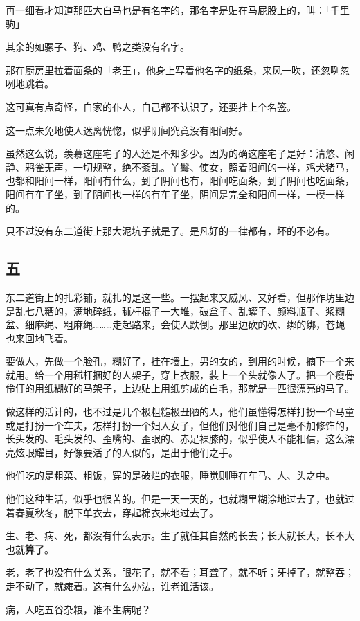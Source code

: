 \documentclass[UTF8]{ctexart}
\begin{document}
再一细看才知道那匹大白马也是有名字的，那名字是贴在马屁股上的，叫：「千里驹」

其余的如骡子、狗、鸡、鸭之类没有名字。

那在厨房里拉着面条的「老王」，他身上写着他名字的纸条，来风一吹，还忽咧忽咧地跳着。

这可真有点奇怪，自家的仆人，自己都不认识了，还要挂上个名签。

这一点未免地使人迷离恍惚，似乎阴间究竟没有阳间好。

虽然这么说，羡慕这座宅子的人还是不知多少。因为的确这座宅子是好：清悠、闲静、鸦雀无声，一切规整，绝不紊乱。丫鬟、使女，照着阳间的一样，鸡犬猪马，也都和阳间一样，阳间有什么，到了阴间也有，阳间吃面条，到了阴间也吃面条，阳间有车子坐，到了阴间也一样的有车子坐，阴间是完全和阳间一样，一模一样的。

只不过没有东二道街上那大泥坑子就是了。是凡好的一律都有，坏的不必有。

\subsection{五}

东二道街上的扎彩铺，就扎的是这一些。一摆起来又威风、又好看，但那作坊里边是乱七八糟的，满地碎纸，秫杆棍子一大堆，破盒子、乱罐子、颜料瓶子、浆糊盆、细麻绳、粗麻绳………走起路来，会使人跌倒。那里边砍的砍、绑的绑，苍蝇也来回地飞着。

要做人，先做一个脸孔，糊好了，挂在墙上，男的女的，到用的时候，摘下一个来就用。给一个用秫杆捆好的人架子，穿上衣服，装上一个头就像人了。把一个瘦骨伶仃的用纸糊好的马架子，上边贴上用纸剪成的白毛，那就是一匹很漂亮的马了。

做这样的活计的，也不过是几个极粗糙极丑陋的人，他们虽懂得怎样打扮一个马童或是打扮一个车夫，怎样打扮一个妇人女子，但他们对他们自己是毫不加修饰的，长头发的、毛头发的、歪嘴的、歪眼的、赤足裸膝的，似乎使人不能相信，这么漂亮炫眼耀目，好像要活了的人似的，是出于他们之手。

他们吃的是粗菜、粗饭，穿的是破烂的衣服，睡觉则睡在车马、人、头之中。

他们这种生活，似乎也很苦的。但是一天一天的，也就糊里糊涂地过去了，也就过着春夏秋冬，脱下单衣去，穿起棉衣来地过去了。

生、老、病、死，都没有什么表示。生了就任其自然的长去；长大就长大，长不大也就\textbf{算了}。

老，老了也没有什么关系，眼花了，就不看；耳聋了，就不听；牙掉了，就整吞；走不动了，就瘫着。这有什么办法，谁老谁活该。

病，人吃五谷杂粮，谁不生病呢？
\end{document}
